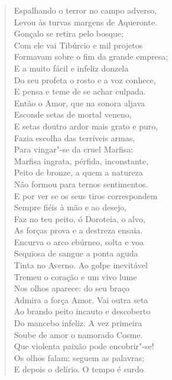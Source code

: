 \begin{verse}
Espalhando o terror no campo adverso,\\
Levou às turvas margens de Aqueronte.\\		\index{\Aque}
Gonçalo se retira pelo bosque;\\
Com ele vai Tibúrcio e mil projetos\\
Formavam sobre o fim da grande empresa;\\
E a muito fácil e infeliz donzela\\
Do seu profeta o rosto e a voz conhece,\\
E pensa e teme de se achar culpada. \\[10pt]


Então o Amor, que na sonora aljava\\		\index{\Amor}
Esconde setas de mortal veneno,\\
E setas doutro ardor mais grato e puro,\\
Fazia escolha das terríveis armas,\\
Para vingar"-se da cruel Marfisa:\\			\index{\Marfi}
Marfisa ingrata, pérfida, inconstante,\\	\index{\Marfi}
Peito de bronze, a quem a natureza\\
Não formou para ternos sentimentos.\\
E por ver se os seus tiros correspondem\\
Sempre fiéis à mão e ao desejo,\\
Faz no teu peito, ó Doroteia, o alvo,\\
As forças prova e a destreza ensaia.\\
Encurva o arco ebúrneo, solta e voa\\
Sequiosa de sangue a ponta aguda\\
Tinta no Averno. Ao golpe inevitável\\
Tremeu o coração e um vivo lume\\
Nos olhos aparece: do seu braço\\
Admira a força Amor. Vai outra seta\\		\index{\Amor}
Ao brando peito incauto e descoberto\\
Do mancebo infeliz. A vez primeira\\
Soube de amor o namorado Cosme.\\
Que violenta paixão pode encobrir"-se!\\
Os olhos falam: seguem as palavras;\\
E depois o delírio. O tempo é surdo\\

\end{verse}
